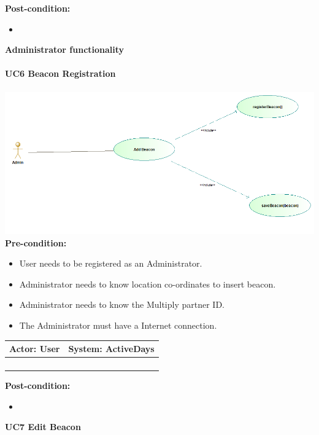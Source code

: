 \documentclass[11pt]{article}
\begin{document}
\textbf{Post-condition: } \\
\begin{itemize}
	\item 
\end{itemize}
\textbf{Administrator functionality}\\\\
\textbf{UC6 Beacon Registration} \\\\
\includegraphics[scale=0.5]{./DiagramsTshepo/addBeacon.png}\\
\textbf{Pre-condition: }   \\
\begin{itemize}
	\item User needs to be registered as an Administrator.
	\item Administrator needs to know location co-ordinates to insert beacon.
	\item Administrator needs to know the Multiply partner ID.
	\item The Administrator must have a Internet connection.
\end{itemize}
\begin{center}
	\begin{tabular}{ |p{8cm}|p{8cm}| }
		\hline
		\textbf{Actor:} User & \textbf{System:} ActiveDays \\
		\hline
		&  \\
		\hline
		&  \\
		\hline
		& \\   
		\hline
		& \\
		\hline
	\end{tabular}
\end{center}		
\textbf{Post-condition: } \\
\begin{itemize}
	\item 
\end{itemize}
\textbf{UC7 Edit Beacon}\\\\
\end{document}
